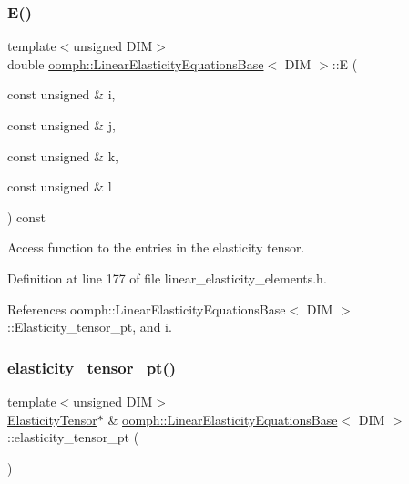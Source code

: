 \subsubsection{\texorpdfstring{E()}{E()}}
{\footnotesize\ttfamily template$<$unsigned D\+IM$>$ \\
double \hyperlink{classoomph_1_1LinearElasticityEquationsBase}{oomph\+::\+Linear\+Elasticity\+Equations\+Base}$<$ D\+IM $>$\+::E (\begin{DoxyParamCaption}\item[{const unsigned \&}]{i,  }\item[{const unsigned \&}]{j,  }\item[{const unsigned \&}]{k,  }\item[{const unsigned \&}]{l }\end{DoxyParamCaption}) const\hspace{0.3cm}{\ttfamily [inline]}}



Access function to the entries in the elasticity tensor. 



Definition at line 177 of file linear\+\_\+elasticity\+\_\+elements.\+h.



References oomph\+::\+Linear\+Elasticity\+Equations\+Base$<$ D\+I\+M $>$\+::\+Elasticity\+\_\+tensor\+\_\+pt, and i.

\mbox{\label{classoomph_1_1LinearElasticityEquationsBase_ac12fbacdae9347b1a570dc1a86c893c3}} 
\subsubsection{\texorpdfstring{elasticity\+\_\+tensor\+\_\+pt()}{elasticity\_tensor\_pt()}}
{\footnotesize\ttfamily template$<$unsigned D\+IM$>$ \\
\hyperlink{classoomph_1_1ElasticityTensor}{Elasticity\+Tensor}$\ast$ \& \hyperlink{classoomph_1_1LinearElasticityEquationsBase}{oomph\+::\+Linear\+Elasticity\+Equations\+Base}$<$ D\+IM $>$\+::elasticity\+\_\+tensor\+\_\+pt (\begin{DoxyParamCaption}{ }\end{DoxyParamCaption})\hspace{0.3cm}{\ttfamily [inline]}}



